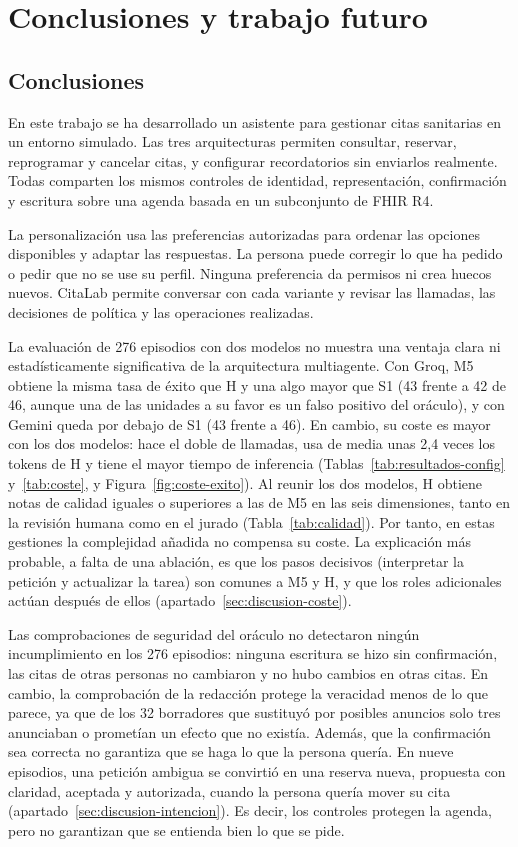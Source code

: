 \chapter{Conclusiones y trabajo futuro}
\label{chap:conclusiones}

\section{Conclusiones}

En este trabajo se ha desarrollado un asistente para gestionar citas sanitarias
en un entorno simulado. Las tres arquitecturas permiten consultar, reservar,
reprogramar y cancelar citas, y configurar recordatorios sin enviarlos
realmente. Todas comparten los mismos controles de identidad, representación,
confirmación y escritura sobre una agenda basada en un subconjunto de FHIR R4.

La personalización usa las preferencias autorizadas para ordenar las opciones
disponibles y adaptar las respuestas. La persona puede corregir lo que ha
pedido o pedir que no se use su perfil. Ninguna preferencia da permisos ni crea
huecos nuevos. CitaLab permite conversar con cada variante y revisar las
llamadas, las decisiones de política y las operaciones realizadas.

La evaluación de 276 episodios con dos modelos no muestra una ventaja clara ni
estadísticamente significativa de la arquitectura multiagente. Con Groq, M5
obtiene la misma tasa de éxito que H y una algo mayor que S1 (43 frente a 42 de
46, aunque una de las unidades a su favor es un falso positivo del oráculo), y
con Gemini queda por debajo de S1 (43 frente a 46). En cambio, su coste es
mayor con los dos modelos: hace el doble de llamadas, usa de media unas 2,4
veces los tokens de H y tiene el mayor tiempo de inferencia
(Tablas~\ref{tab:resultados-config} y~\ref{tab:coste}, y
Figura~\ref{fig:coste-exito}). Al reunir los dos
modelos, H obtiene notas de calidad iguales o superiores a las de M5 en las
seis dimensiones, tanto en la revisión humana como en el jurado
(Tabla~\ref{tab:calidad}). Por tanto, en estas gestiones la complejidad añadida
no compensa su coste. La explicación más probable, a falta de una ablación, es
que los pasos decisivos (interpretar la petición y actualizar la tarea) son
comunes a M5 y H, y que los roles adicionales actúan después de ellos
(apartado~\ref{sec:discusion-coste}).

Las comprobaciones de seguridad del oráculo no detectaron ningún incumplimiento
en los 276 episodios: ninguna escritura se hizo sin confirmación, las citas de otras personas no cambiaron y no hubo
cambios en otras citas. En cambio, la comprobación de la redacción protege la
veracidad menos de lo que parece, ya que de los 32 borradores que sustituyó por
posibles anuncios solo tres anunciaban o prometían un efecto que no existía.
Además, que la confirmación sea correcta no garantiza que se haga lo que la
persona quería. En nueve episodios, una petición ambigua se convirtió en una
reserva nueva, propuesta con claridad, aceptada y autorizada, cuando la persona
quería mover su cita (apartado~\ref{sec:discusion-intencion}). Es decir, los
controles protegen la agenda, pero no garantizan que se entienda bien lo que se
pide.

